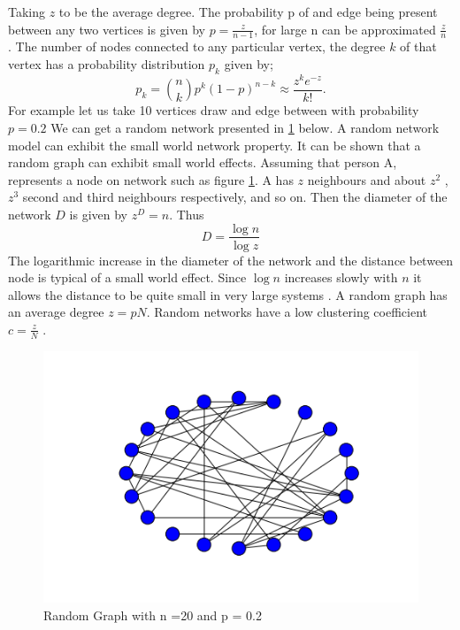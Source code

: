 Taking $z$ to be the average degree. The probability p of and edge being present between any two vertices is given by $p = \frac{z}{n-1}$, for large n can be approximated  $\frac{z}{n}$  \citep{newman2002random}. The number of nodes connected to any particular vertex, the degree $k$ of that vertex has a probability distribution $p_k$ given by;
 \begin{equation}
 p_k = \binom{n}{k} p^k (1-p)^{n-k} \approx \frac{z^k e^{-z}}{k!}.
 \end{equation}
   For example let us take 10 vertices draw and edge between with probability $p = 0.2$ We can get a random network presented in \ref{fig:3.1} below. A random network model can exhibit the small world network property. 
   It can be shown that a random graph can exhibit small world effects. Assuming that person A, represents a node on network such as  figure \ref{fig:3.1}. A has $z$ neighbours and  about $z^2$ , $z^3$  second and third neighbours respectively, and so on. Then the diameter of the network $D$ is given by $z^D = n$. Thus
   \begin{equation*}
   D = \frac{\log n}{\log z}
   \end{equation*}
    The logarithmic increase in the diameter of the network and the distance between node is typical of a small world effect. Since $\log n$ increases slowly with $n$ it allows the distance to be quite small in very large systems \citep{newman2000models}.
    A random graph  has an average degree $z= pN$. Random networks have a low clustering coefficient $ c = \frac{z}{N}$ \citep{newman2003structure}.
   \begin{figure}[h!]
   \caption{Random Graph with n =20 and p = 0.2}
   \label{fig:3.1}
   \centering
   \includegraphics[scale=0.5]{images/randomgraph.png} 
   \end{figure}
   
